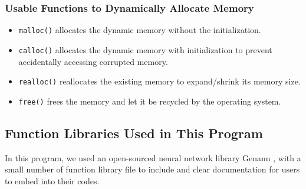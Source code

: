 	    \subsubsection{Usable Functions to Dynamically Allocate Memory}
	    \begin{itemize}
	        \item \lstinline{malloc()} allocates the dynamic memory without the initialization. 
	        \item \lstinline{calloc()} allocates the dynamic memory with initialization to prevent accidentally accessing  corrupted memory. 
	        \item \lstinline{realloc()} reallocates the existing memory to expand/shrink its memory size.
	        \item \lstinline{free()} frees the memory and let it be recycled by the operating system.
	    \end{itemize}
	     
	    \subsection{Function Libraries Used in This Program}
	    In this program, we used an open-sourced neural network library Genann \cite{ref2}, with a small number of function library file to include and clear documentation for users to embed into their codes.    
